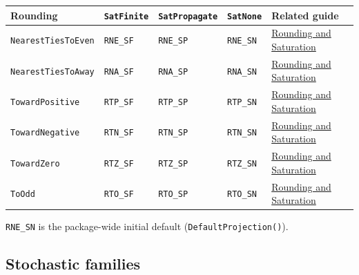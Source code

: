 \begin{table}[h]
\centering
\begin{tabulary}{\linewidth}{L L L L L}
\toprule
Rounding & \texttt{SatFinite} & \texttt{SatPropagate} & \texttt{SatNone} & Related guide \\
\toprule
\texttt{NearestTiesToEven} & \texttt{RNE\_\allowbreak{}SF} & \texttt{RNE\_\allowbreak{}SP} & \texttt{RNE\_\allowbreak{}SN} & \href{concept\_\allowbreak{}rounding\_\allowbreak{}saturation.md}{Rounding and Saturation} \\
\texttt{NearestTiesToAway} & \texttt{RNA\_\allowbreak{}SF} & \texttt{RNA\_\allowbreak{}SP} & \texttt{RNA\_\allowbreak{}SN} & \href{concept\_\allowbreak{}rounding\_\allowbreak{}saturation.md}{Rounding and Saturation} \\
\texttt{TowardPositive} & \texttt{RTP\_\allowbreak{}SF} & \texttt{RTP\_\allowbreak{}SP} & \texttt{RTP\_\allowbreak{}SN} & \href{concept\_\allowbreak{}rounding\_\allowbreak{}saturation.md}{Rounding and Saturation} \\
\texttt{TowardNegative} & \texttt{RTN\_\allowbreak{}SF} & \texttt{RTN\_\allowbreak{}SP} & \texttt{RTN\_\allowbreak{}SN} & \href{concept\_\allowbreak{}rounding\_\allowbreak{}saturation.md}{Rounding and Saturation} \\
\texttt{TowardZero} & \texttt{RTZ\_\allowbreak{}SF} & \texttt{RTZ\_\allowbreak{}SP} & \texttt{RTZ\_\allowbreak{}SN} & \href{concept\_\allowbreak{}rounding\_\allowbreak{}saturation.md}{Rounding and Saturation} \\
\texttt{ToOdd} & \texttt{RTO\_\allowbreak{}SF} & \texttt{RTO\_\allowbreak{}SP} & \texttt{RTO\_\allowbreak{}SN} & \href{concept\_\allowbreak{}rounding\_\allowbreak{}saturation.md}{Rounding and Saturation} \\
\bottomrule
\end{tabulary}

\end{table}



\texttt{RNE\_\allowbreak{}SN} is the package-wide initial default (\texttt{DefaultProjection()}).



\subsection{Stochastic families}



\label{8787228723720205682}{}


